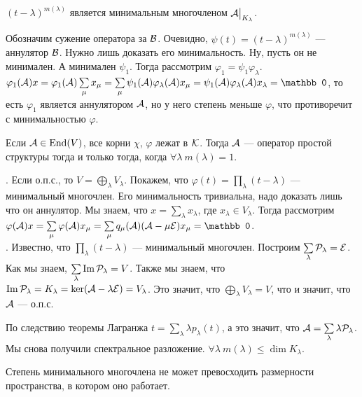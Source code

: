 \documentclass{article}
\DeclareMathOperator{\operIm}{Im}
\let\Im\operIm
\newcommand*{\id}{{\scriptE}}
\begin{document}
\begin{itemize}
\begin{Proof}
        \end{Proof}
        \thm $(t-\lambda)^{m(\lambda)}$ является минимальным многочленом ${\mathcal{A}}\big|_{K_\lambda}$.
        \begin{Proof}
            Обозначим сужение оператора за ${\mathcal{B}}$. Очевидно, $\psi(t)=(t-\lambda)^{m(\lambda)}$ --- аннулятор ${\mathcal{B}}$. Нужно лишь доказать его минимальность. Ну, пусть он не минимален. А минимален $\psi_1$. Тогда рассмотрим $\varphi_1=\psi_1\varphi_\lambda$. $\varphi_1(\scriptA)x=\varphi_1(\scriptA)\sum\limits_\mu x_\mu=\sum\limits_{\mu}\psi_1(\scriptA)\varphi_\lambda(\scriptA)x_\mu=\psi_1(\scriptA)\varphi_\lambda(\scriptA)x_\lambda=\mathbb0$, то есть $\varphi_1$ является аннулятором ${\mathcal{A}}$, но у него степень меньше $\varphi$, что противоречит с минимальностью $\varphi$.
        \end{Proof}
        \thm Если ${\mathcal{A}}\in\operatorname{End}(V)$, все корни $\chi$, $\varphi$ лежат в ${\mathcal{K}}$. Тогда ${\mathcal{A}}$ --- оператор простой структуры тогда и только тогда, когда $\forall\lambda~m(\lambda)=1$.
        \begin{Proof}
            \rightimp. Если о.п.с., то $V=\bigoplus\limits_\lambda V_\lambda$. Покажем, что $\varphi(t)=\prod\limits_{\lambda}(t-\lambda)$ --- минимальный многочлен. Его минимальность тривиальна, надо доказать лишь что он аннулятор. Мы знаем, что $x=\sum\limits_{\lambda}x_\lambda$, где $x_\lambda\in V_\lambda$. Тогда рассмотрим $\varphi(\scriptA)x=\sum\limits_{\mu}\varphi(\scriptA)x_\mu=\sum\limits_{\mu}q_\mu(\scriptA)(\scriptA-\mu\id)x_\mu=\mathbb0$.\\
            \leftimp. Известно, что $\prod\limits_\lambda(t-\lambda)$ --- минимальный многочлен. Построим $\sum\limits_{\lambda}\scriptP_\lambda=\id$. Как мы знаем, $\sum\limits_{\lambda}\Im\scriptP_\lambda=V$. Также мы знаем, что $\Im\scriptP_\lambda=K_\lambda=\ker(\scriptA-\lambda\id)=V_\lambda$. Это значит, что $\bigoplus\limits_{\lambda}V_\lambda=V$, что и значит, что ${\mathcal{A}}$ --- о.п.с.
        \end{Proof}
        \thm По следствию теоремы Лагранжа $t=\sum\limits_{\lambda}\lambda p_\lambda(t)$, а это значит, что ${\mathcal{A}}=\sum\limits_{\lambda}\lambda{\mathcal{P}}_\lambda$. Мы снова получили спектральное разложение.
        \thm $\forall\lambda~m(\lambda)\leqslant\dim K_\lambda$.
        \begin{Proof}
            Степень минимального многочлена не может превосходить размерности пространства, в котором оно работает.
        \end{Proof}
    \end{itemize}
\end{document}
